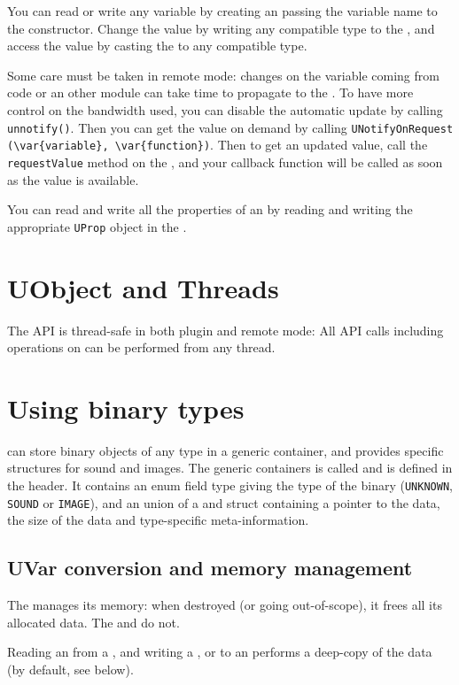 You can read or write any \urbi variable by creating an
\UVar passing the variable name to the constructor. Change
the value by writing any compatible type to the \UVar, and
access the value by casting the \UVar to any compatible
type.

Some care must be taken in remote mode: changes on the
variable coming from \urbi code or an other module can take time to propagate
to the \UVar. To have more control on the bandwidth used, you can
disable the automatic update by calling \lstinline|unnotify()|. Then you can get
the value on demand by calling
\lstinline|UNotifyOnRequest (\var{variable}, \var{function})|. Then to get an
updated value, call the \lstinline{requestValue} method on the
\UVar, and your callback function will be called as soon as
the value is available.

You can read and write all the \urbi properties of an \UVar by
reading and writing the appropriate \lstinline{UProp} object in the
\UVar.

\section{UObject and Threads}

The \UObject API is thread-safe in both plugin and remote mode: All API calls
including operations on \UVar can be performed from any thread.

\section{Using binary types}

\urbi can store binary objects of any type in a generic container, and
provides specific structures for sound and images. The generic
containers is called \UBinary and is defined in the
 header. It contains an enum field type
giving the type of the binary (\lstinline{UNKNOWN}, \lstinline{SOUND}
or \lstinline{IMAGE}), and an union of a \USound and
\UImage struct containing a pointer to the data, the size
of the data and type-specific meta-information.

\subsection{UVar conversion and memory management}
The \UBinary manages its memory: when destroyed (or going out-of-scope), it
frees all its allocated data. The \USound and \UImage do not.

Reading an \UBinary from a \UVar, and writing a
\UBinary, \USound or \UImage to an \UVar performs a deep-copy of the
data (by default, see below).


